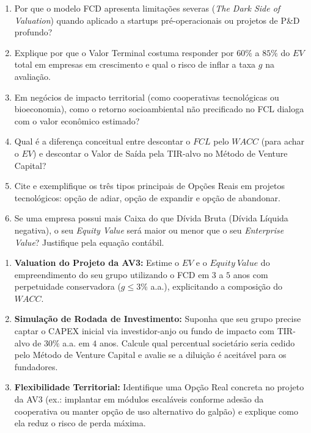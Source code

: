\begin{enumerate}[leftmargin=1.6em, itemsep=5pt]
  \item Por que o modelo FCD apresenta limitações severas (\textit{The Dark Side of Valuation}) quando aplicado a startups pré-operacionais ou projetos de P\&D profundo? \espacoResolucao[1.5cm]
  \item Explique por que o Valor Terminal costuma responder por $60\%$ a $85\%$ do $EV$ total em empresas em crescimento e qual o risco de inflar a taxa $g$ na avaliação. \espacoResolucao[1.5cm]
  \item Em negócios de impacto territorial (como cooperativas tecnológicas ou bioeconomia), como o retorno socioambiental não precificado no FCL dialoga com o valor econômico estimado? \espacoResolucao[1.5cm]
  \item Qual é a diferença conceitual entre descontar o $FCL$ pelo $WACC$ (para achar o $EV$) e descontar o Valor de Saída pela TIR-alvo no Método de Venture Capital? \espacoResolucao[1.5cm]
  \item Cite e exemplifique os três tipos principais de Opções Reais em projetos tecnológicos: opção de adiar, opção de expandir e opção de abandonar. \espacoResolucao[1.5cm]
  \item Se uma empresa possui mais Caixa do que Dívida Bruta (Dívida Líquida negativa), o seu \textit{Equity Value} será maior ou menor que o seu \textit{Enterprise Value}? Justifique pela equação contábil. \espacoResolucao[1.5cm]
\end{enumerate}


\begin{enumerate}[leftmargin=1.6em, itemsep=5pt]
  \item \textbf{Valuation do Projeto da AV3:} Estime o $EV$ e o $Equity\ Value$ do empreendimento do seu grupo utilizando o FCD em $3$ a $5$ anos com perpetuidade conservadora ($g \le 3\%$ a.a.), explicitando a composição do $WACC$. \espacoResolucao[2.0cm]
  \item \textbf{Simulação de Rodada de Investimento:} Suponha que seu grupo precise captar o CAPEX inicial via investidor-anjo ou fundo de impacto com TIR-alvo de $30\%$ a.a. em $4$ anos. Calcule qual percentual societário seria cedido pelo Método de Venture Capital e avalie se a diluição é aceitável para os fundadores. \espacoResolucao[1.9cm]
  \item \textbf{Flexibilidade Territorial:} Identifique uma Opção Real concreta no projeto da AV3 (ex.: implantar em módulos escaláveis conforme adesão da cooperativa ou manter opção de uso alternativo do galpão) e explique como ela reduz o risco de perda máxima. \espacoResolucao[1.6cm]
\end{enumerate}


